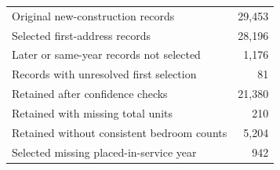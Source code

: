 \begin{tabular}{lr}
\hline
Original new-construction records & 29,453 \\
Selected first-address records & 28,196 \\
Later or same-year records not selected & 1,176 \\
Records with unresolved first selection & 81 \\
Retained after confidence checks & 21,380 \\
Retained with missing total units & 210 \\
Retained without consistent bedroom counts & 5,204 \\
Selected missing placed-in-service year & 942 \\
\hline
\end{tabular}
